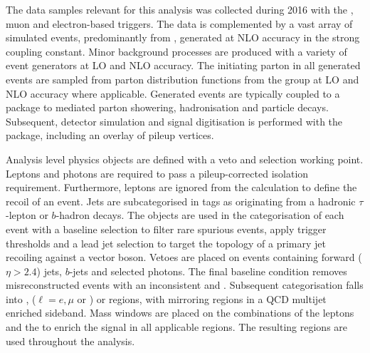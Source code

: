 The data samples relevant for this analysis was collected during 2016 with the \ptmiss, muon and electron-based triggers. The data is complemented by a vast array of simulated events, predominantly from \IVj, generated at NLO accuracy in the strong coupling constant. Minor background processes are produced with a variety of event generators at LO and NLO accuracy. The initiating parton in all generated events are sampled from parton distribution functions from the \NNPDF group at LO and NLO accuracy where applicable. Generated events are typically coupled to a package to mediated parton showering, hadronisation and particle decays. Subsequent, detector simulation and signal digitisation is performed with the \GEANT package, including an overlay of pileup vertices.

Analysis level physics objects are defined with a veto and selection working point. Leptons and photons are required to pass a pileup-corrected isolation requirement. Furthermore, leptons are ignored from the \ptmiss calculation to define the recoil of an event. Jets are subcategorised in tags as originating from a hadronic $\tau$-lepton or $b$-hadron decays. The objects are used in the categorisation of each event with a baseline selection to filter rare spurious \ptmiss events, apply trigger thresholds and a lead jet selection to target the topology of a primary jet recoiling against a vector boson. Vetoes are placed on events containing forward (${\eta>2.4}$) jets, $b$-jets and selected photons. The final baseline condition removes misreconstructed events with an inconsistent \ptmiss and \ptmisscalo. Subsequent categorisation falls into \metplusjets, \ellplusjets ($\ell=e,\mu$ or \Ptauh) or \diellplusjets regions, with mirroring regions in a QCD multijet enriched sideband. Mass windows are placed on the combinations of the leptons and the \ptmiss to enrich the signal in all applicable regions. The resulting regions are used throughout the analysis.
